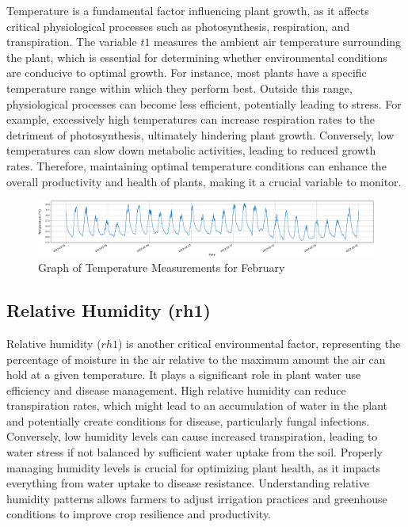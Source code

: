 Temperature is a fundamental factor influencing plant growth, as it affects critical physiological processes such as photosynthesis, respiration, and transpiration. The variable \( t1 \) measures the ambient air temperature surrounding the plant, which is essential for determining whether environmental conditions are conducive to optimal growth. For instance, most plants have a specific temperature range within which they perform best. Outside this range, physiological processes can become less efficient, potentially leading to stress. For example, excessively high temperatures can increase respiration rates to the detriment of photosynthesis, ultimately hindering plant growth. Conversely, low temperatures can slow down metabolic activities, leading to reduced growth rates. Therefore, maintaining optimal temperature conditions can enhance the overall productivity and health of plants, making it a crucial variable to monitor.

\begin{figure}[htbp]
    \centering
    \includegraphics[width=15 cm]{4_ChapterMaterials/figuras/train_data_Temperature.pdf}
    \caption{Graph of Temperature Measurements for February}
    \end{figure}

\subsection{Relative Humidity (rh1)}

Relative humidity (\( rh1 \)) is another critical environmental factor, representing the percentage of moisture in the air relative to the maximum amount the air can hold at a given temperature. It plays a significant role in plant water use efficiency and disease management. High relative humidity can reduce transpiration rates, which might lead to an accumulation of water in the plant and potentially create conditions for disease, particularly fungal infections. Conversely, low humidity levels can cause increased transpiration, leading to water stress if not balanced by sufficient water uptake from the soil. Properly managing humidity levels is crucial for optimizing plant health, as it impacts everything from water uptake to disease resistance. Understanding relative humidity patterns allows farmers to adjust irrigation practices and greenhouse conditions to improve crop resilience and productivity.

